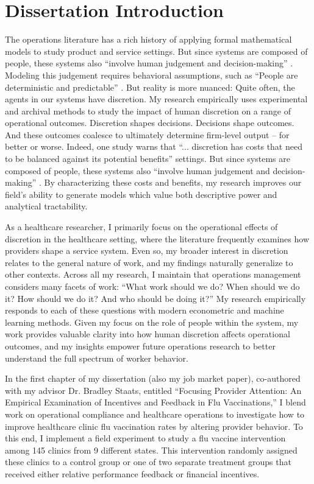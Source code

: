 \setcounter{chapter}{-1} 
\chapter{Dissertation Introduction} 
The operations literature has a rich history of applying formal mathematical models to study product and service settings. But since systems are composed of people, these systems also “involve human judgement and decision-making” \citep[p. 325]{Allon2019}. Modeling this judgement requires behavioral assumptions, such as “People are deterministic and predictable” \citep[p. 183]{Boudreau2003}. But reality is more nuanced: Quite often, the agents in our systems have discretion. My research empirically uses experimental and archival methods to study the impact of human discretion on a range of operational outcomes. Discretion shapes decisions. Decisions shape outcomes. And these outcomes coalesce to ultimately determine firm-level output – for better or worse. Indeed, one study warns that “... discretion has costs that need to be balanced against its potential benefits” settings. But since systems are composed of people, these systems also “involve human judgement and decision-making” \citep[p. 4404]{Ibanez2019}. By characterizing these costs and benefits, my research improves our field’s ability to generate models which value both descriptive power and analytical tractability. 

As a healthcare researcher, I primarily focus on the operational effects of discretion in the healthcare setting, where the literature frequently examines how providers shape a service system. Even so, my broader interest in discretion relates to the general nature of work, and my findings naturally generalize to other contexts. Across all my research, I maintain that operations management considers many facets of work: “What work should we do? When should we do it? How should we do it? And who should be doing it?” My research empirically responds to each of these questions with modern econometric and machine learning methods. Given my focus on the role of people within the system, my work provides valuable clarity into how human discretion affects operational outcomes, and my insights empower future operations research to better understand the full spectrum of worker behavior.

In the first chapter of my dissertation (also my job market paper), co-authored with my advisor Dr. Bradley Staats, entitled “Focusing Provider Attention: An Empirical Examination of Incentives and Feedback in Flu Vaccinations,” I blend work on operational compliance and healthcare operations to investigate how to improve healthcare clinic flu vaccination rates by altering provider behavior. To this end, I implement a field experiment to study a flu vaccine intervention among 145 clinics from 9 different states. This intervention randomly assigned these clinics to a control group or one of two separate treatment groups that received either relative performance feedback or financial incentives. 

